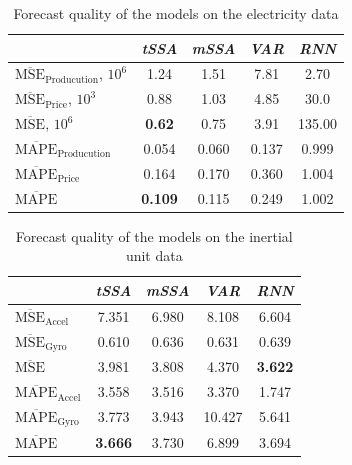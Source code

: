 \documentclass[referee, pdflatex, sn-mathphys-num]{sn-jnl}
\theoremstyle{definition}
\theoremstyle{plain}
\begin{document}
	\def\arraystretch{1.2}
	\begin{table}[h]
		\centering
		\caption{Forecast quality of the models on the electricity data}\label{tab:pred_res_electr}
		\begin{tabular}{|l|c|c|c|c|}
			\hline
			\diagbox[width=3.3cm]{Metric}{Method} & \textit{tSSA}  & \textit{mSSA} & \textit{VAR} & \textit{RNN} \\ \hline
			$ \overline{\text{MSE}}_{\text{Producution}} $, $10^6$ & 1.24           & 1.51          & 7.81         & 2.70         \\ \hline
			$ \overline{\text{MSE}}_{\text{Price}} $, $10^3$      & 0.88           & 1.03          & 4.85         & 30.0         \\ \hline
			$ \overline{\text{MSE}} $, $10^6$             & \textbf{0.62}  & 0.75          & 3.91         & 135.00       \\ \hline
			$ \overline{\text{MAPE}}_{\text{Producution}} $        & 0.054          & 0.060         & 0.137        & 0.999        \\ \hline
			$ \overline{\text{MAPE}}_{\text{Price}} $             & 0.164          & 0.170         & 0.360        & 1.004        \\ \hline
			$ \overline{\text{MAPE}} $                    & \textbf{0.109} & 0.115         & 0.249        & 1.002        \\ \hline
		\end{tabular}
	\end{table}
	
	\def\arraystretch{1.2}
	\begin{table}[h]
		\centering
		\caption{Forecast quality of the models on the inertial unit data}\label{tab:pred_res_motion}
		\begin{tabular}{|l|c|c|c|c|}
			\hline
			\diagbox{Metric}{Method} & \textit{tSSA}                & \textit{mSSA} & \textit{VAR} & \textit{RNN} \\ \hline
			$ \overline{\text{MSE}}_{\text{Accel}} $  & 7.351          & 6.980 & 8.108  & 6.604          \\ \hline
			$ \overline{\text{MSE}}_{\text{Gyro}} $   & 0.610          & 0.636 & 0.631  & 0.639          \\ \hline
			$ \overline{\text{MSE}} $         & 3.981          & 3.808 & 4.370  & \textbf{3.622} \\ \hline
			$ \overline{\text{MAPE}}_{\text{Accel}} $ & 3.558          & 3.516 & 3.370  & 1.747          \\ \hline
			$ \overline{\text{MAPE}}_{\text{Gyro}} $  & 3.773          & 3.943 & 10.427 & 5.641          \\ \hline
			$ \overline{\text{MAPE}} $        & \textbf{3.666} & 3.730 & 6.899  & 3.694          \\ \hline
		\end{tabular}
	\end{table}
	
\end{document}
